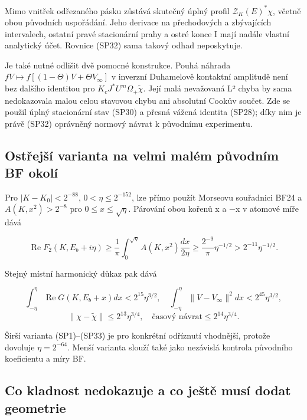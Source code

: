 \documentclass[11pt,a4paper]{article}
\theoremstyle{remark}\newtheorem{remark}[theorem]{Poznámka}
\numberwithin{equation}{section}
\begin{document}
Mimo vnitřek odřezaného pásku zůstává skutečný úplný profil
\(\mathcal Z_K(E)^*\chi\), včetně obou původních uspořádání. Jeho
derivace na přechodových a zbývajících intervalech, ostatní pravé
stacionární prahy a ostré konce I mají nadále vlastní analytický účet.
Rovnice (SP32) sama takový odhad neposkytuje.

Je také nutné odlišit dvě pomocné konstrukce. Pouhá náhrada
\(fV\mapsto f[(1-\Theta)V+\Theta V_\infty]\) v inverzní Duhamelově
kontaktní amplitudě není bez dalšího identitou pro
\(K_cJ^*U^m\Omega_+\widetilde\chi\). Její malá nevažovaná L² chyba by
sama nedokazovala malou celou stavovou chybu ani absolutní Cookův
součet. Zde se použil úplný stacionární stav (SP30) a přesná vážená
identita (SP28); díky nim je právě (SP32) oprávněný normový návrat k
původnímu experimentu.

\hypertarget{ostux159ejux161uxed-varianta-na-velmi-maluxe9m-pux16fvodnuxedm-bf-okoluxed}{%
\subsection{Ostřejší varianta na velmi malém původním BF
okolí}\label{ostux159ejux161uxed-varianta-na-velmi-maluxe9m-pux16fvodnuxedm-bf-okoluxed}}

Pro \(|K-K_0|<2^{-88}\), \(0<\eta\le2^{-152}\), lze přímo použít
Morseovu souřadnici BF24 a \(A(K,x^2)>2^{-8}\) pro
\(0\le x\le\sqrt\eta\). Párování obou kořenů x a −x v atomové míře dává

\[
\operatorname{Re}F_2(K,E_b+i\eta)
\ge\frac1\pi\int_0^{\sqrt\eta}
A(K,x^2)\frac{dx}{2\eta}
\ge\frac{2^{-9}}\pi\eta^{-1/2}>2^{-11}\eta^{-1/2}.
\tag{SP35}
\]

Stejný místní harmonický důkaz pak dává

\[
\int_{-\eta}^{\eta}\operatorname{Re}G(K,E_b+x)dx
<2^{15}\eta^{3/2},
\quad
\int_{-\eta}^{\eta}\|V-V_\infty\|^2dx<2^{45}\eta^{3/2},
\] \[
\|\chi-\widetilde\chi\|\le2^{13}\eta^{3/4},
\quad\text{časový návrat}\le2^{14}\eta^{3/4}.
\tag{SP36}
\]

Širší varianta (SP1)--(SP33) je pro konkrétní odříznutí vhodnější,
protože dovoluje \(\eta=2^{-64}\). Menší varianta slouží také jako
nezávislá kontrola původního koeficientu a míry BF.

\hypertarget{co-kladnost-nedokazuje-a-co-jeux161tux11b-musuxed-dodat-geometrie}{%
\subsection{Co kladnost nedokazuje a co ještě musí dodat
geometrie}\label{co-kladnost-nedokazuje-a-co-jeux161tux11b-musuxed-dodat-geometrie}}
\end{document}
